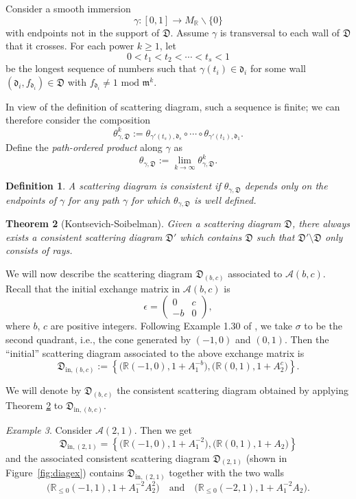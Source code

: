 \documentclass[11pt]{amsart}
\newtheorem{theorem}{Theorem}[section]
\newtheorem{defn}[theorem]{Definition}
\theoremstyle{remark}
\newtheorem{example}[theorem]{Example}
\numberwithin{equation}{section}
\newcommand{\RR}{\mathbb{R}}
\newcommand{\cA}{\mathcal{A}}
\newcommand{\fd}{\mathfrak{d}}
\newcommand{\fD}{\mathfrak{D}}
\newcommand{\fm}{\mathfrak{m}}
\begin{document}
Consider a smooth immersion
\[  
  \gamma: [0,1] \rightarrow M_{\mathbb{R}} \backslash  \{0 \}  
\]
with endpoints not in the support of $\fD$. Assume $\gamma$ is transversal to
each wall of $\fD$ that it crosses. For each power $k \geq 1$, let  
\[
  0< t_1 <  t_2 < \cdots < t_s < 1 
\]
be the longest sequence of numbers such that $\gamma(t_i)\in\fd_i$ for some wall
$(\fd_i,f_{\fd_i}) \in \fD$ with $f_{\fd_i} \neq 1 \text{ mod } \fm^k$.

In view of the definition of scattering diagram, such a sequence is finite; we
can therefore consider the composition 
\[
  \theta^k_{\gamma, \fD} :=
  \theta_{\gamma'(t_s),\fd_s} \circ \cdots \circ \theta_{\gamma'(t_1),\fd_1}.
\]
Define the \textit{path-ordered product} along $\gamma$ as
\[
  \theta_{\gamma, \fD} := \lim_{k \rightarrow \infty} \theta ^k_{\gamma, \fD}. 
\]

\begin{defn}
  A scattering diagram is \emph{consistent} if $\theta _{\gamma, \fD}$ depends
  only on the endpoints of $\gamma$ for any path $\gamma$ for which
  $\theta_{\gamma, \fD}$ is well defined.
\end{defn}

\begin{theorem}[Kontsevich-Soibelman] 
  \label{KS}
  Given a scattering diagram $\fD$, there always exists a consistent scattering
  diagram $\fD'$ which contains $\fD$ such that $\fD'\setminus\fD$ only consists
  of rays.
\end{theorem}

We will now describe the scattering diagram $\fD_{(b,c)}$ associated to 
$\cA(b,c)$.
Recall that the initial exchange matrix in $\cA(b,c)$ is 
\[
  \epsilon = \begin{pmatrix} 0 & c\\ -b & 0\end{pmatrix},
\]
where $b$, $c$ are positive integers.  Following Example 1.30 of \cite{GHKK}, we
take $\sigma$ to be the second quadrant, i.e., the cone generated by $(-1,0)$ and
$(0,1)$. Then the ``initial'' scattering diagram associated to the above exchange
matrix is
\[
  \fD_{\mathrm{in},(b,c)} := 
  \left\{
    \big( \RR (-1,0), 1+A_1^{-b}\big), 
    \big( \RR (0,1), 1+A_2^c\big) 
  \right\}.
\]

We will denote by $\fD_{(b,c)}$ the consistent scattering diagram obtained by
applying Theorem \ref{KS} to $\fD_{\mathrm{in},(b,c)}$.

\begin{example} 
  \label{ex}
  Consider $\cA(2,1)$. Then we get
  \[
    \fD_{\mathrm{in},(2,1)} =  
    \left\{ 
      \big(\RR (-1,0), 1+A_1^{-2}\big), 
      \big(\RR (0,1), 1+A_2\big)  
    \right\}   
  \]
  and the associated consistent scattering diagram $\fD_{(2,1)}$ (shown in
  Figure~\ref{fig:diagex}) contains $\fD_{\mathrm{in},(2,1)}$ together with
  the two walls
  \[ 
    \big( \RR_{\leq 0} (-1,1), 1+A_1^{-2}A_2^2 \big)
    \quad \mbox{and} \quad
    \big( \RR_{\leq 0} (-2,1), 1+A_1^{-2}A_2 \big).
  \]
\end{example}
\end{document}
